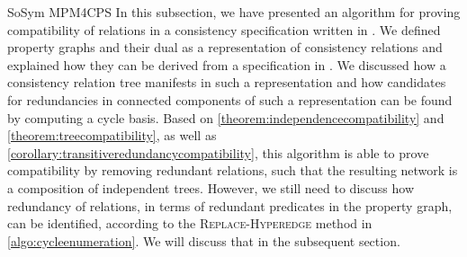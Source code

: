 \begin{copiedFrom}{SoSym MPM4CPS}
In this subsection, we have presented an algorithm for proving compatibility of relations in a consistency specification written in \qvtr.
We defined property graphs and their dual as a representation of consistency relations and explained how they can be derived from a specification in \qvtr.
We discussed how a consistency relation tree manifests in such a representation and how candidates for redundancies in connected components of such a representation can be found by computing a cycle basis.
Based on \autoref{theorem:independencecompatibility} and \autoref{theorem:treecompatibility}, as well as \autoref{corollary:transitiveredundancycompatibility}, this algorithm is able to prove compatibility by removing redundant relations, such that the resulting network is a composition of independent trees.
However, we still need to discuss how redundancy of relations, in terms of redundant predicates in the property graph, can be identified, according to the \textsc{Replace-Hyperedge} method in \autoref{algo:cycleenumeration}.
We will discuss that in the subsequent section.



\end{copiedFrom}
